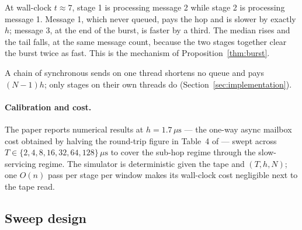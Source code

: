 \documentclass[11pt]{article}
\begin{document}
At wall-clock $t \approx 7$, stage 1 is processing message 2 while stage 2 is
processing message 1. Message 1, which never queued, pays the hop and is slower by exactly $h$; message 3, at
the end of the burst, is faster by a third. The median rises and the tail falls, at the
same message count, because the two stages together clear the burst twice as fast. This is the mechanism of Proposition~\ref{thm:burst}.

A chain of synchronous sends on one thread shortens no queue and pays
$(N-1)h$; only stages on their own threads do (Section~\ref{sec:implementation}).

\paragraph{Calibration and cost.} The paper reports numerical results at $h =
1.7\,\mu\mathrm{s}$ --- the one-way async mailbox cost obtained by halving the round-trip
figure in Table~4 of \citet{mayeski_fastsend} --- swept across $T \in
\{2, 4, 8, 16, 32, 64, 128\}\,\mu\mathrm{s}$ to cover the sub-hop regime through the slow-servicing
regime. The simulator is deterministic given the tape and $(T, h, N)$; one $O(n)$ pass per
stage per window makes its wall-clock cost negligible next to the tape read.


\subsection{Sweep design}
\label{sec:setup-sweep}
\end{document}
